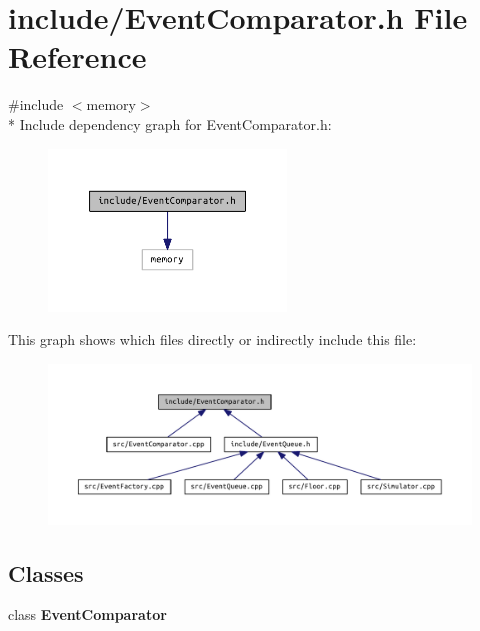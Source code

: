 \section{include/\+Event\+Comparator.h File Reference}
\label{_event_comparator_8h}
{\ttfamily \#include $<$memory$>$}\\*
Include dependency graph for Event\+Comparator.\+h\+:
\nopagebreak
\begin{figure}[H]
\begin{center}
\leavevmode
\includegraphics[width=179pt]{_event_comparator_8h__incl}
\end{center}
\end{figure}
This graph shows which files directly or indirectly include this file\+:
\nopagebreak
\begin{figure}[H]
\begin{center}
\leavevmode
\includegraphics[width=350pt]{_event_comparator_8h__dep__incl}
\end{center}
\end{figure}
\subsection*{Classes}
\begin{DoxyCompactItemize}
\item 
class {\bf Event\+Comparator}
\end{DoxyCompactItemize}
